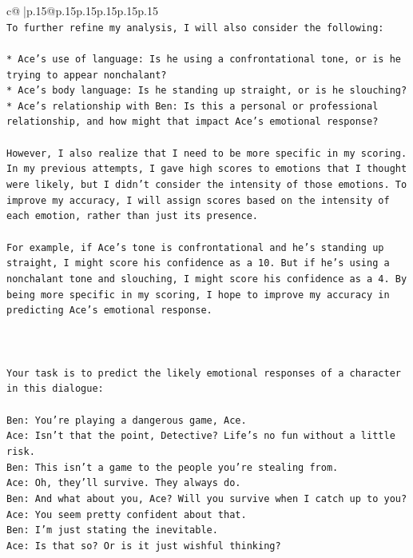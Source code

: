 \documentclass{article}
\begin{document}
{\begin{supertabular}{c@{$\;$}|p{.15\linewidth}@{}p{.15\linewidth}p{.15\linewidth}p{.15\linewidth}p{.15\linewidth}p{.15\linewidth}}
{{{\\ 
\texttt{To further refine my analysis, I will also consider the following:} \\
\\ 
\texttt{* Ace's use of language: Is he using a confrontational tone, or is he trying to appear nonchalant?} \\
\texttt{* Ace's body language: Is he standing up straight, or is he slouching?} \\
\texttt{* Ace's relationship with Ben: Is this a personal or professional relationship, and how might that impact Ace's emotional response?} \\
\\ 
\texttt{However, I also realize that I need to be more specific in my scoring. In my previous attempts, I gave high scores to emotions that I thought were likely, but I didn't consider the intensity of those emotions. To improve my accuracy, I will assign scores based on the intensity of each emotion, rather than just its presence.} \\
\\ 
\texttt{For example, if Ace's tone is confrontational and he's standing up straight, I might score his confidence as a 10. But if he's using a nonchalant tone and slouching, I might score his confidence as a 4. By being more specific in my scoring, I hope to improve my accuracy in predicting Ace's emotional response.} \\
\\ 
\\ 
\\ 
\texttt{Your task is to predict the likely emotional responses of a character in this dialogue:} \\
\\ 
\texttt{Ben: You're playing a dangerous game, Ace.} \\
\texttt{Ace: Isn't that the point, Detective? Life's no fun without a little risk.} \\
\texttt{Ben: This isn't a game to the people you're stealing from.} \\
\texttt{Ace: Oh, they'll survive. They always do.} \\
\texttt{Ben: And what about you, Ace? Will you survive when I catch up to you?} \\
\texttt{Ace: You seem pretty confident about that.} \\
\texttt{Ben: I'm just stating the inevitable.} \\
\texttt{Ace: Is that so? Or is it just wishful thinking?} \\
}}}
\end{supertabular}}
\end{document}

